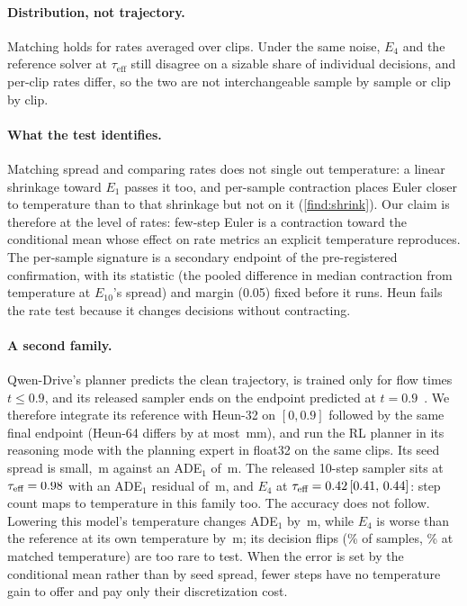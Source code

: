 \documentclass{article}
\theoremstyle{plain}
\theoremstyle{definition}
\theoremstyle{remark}
\newcommand{\taueff}{\tau_{\mathrm{eff}}}
\newcommand{\TODO}[1]{\todo[inline,color=orange!25]{TODO: #1}}
\begin{document}
\paragraph{Distribution, not trajectory.} Matching holds for rates averaged over clips. Under the same noise, $E_4$ and the reference solver at $\taueff$ still disagree on a sizable share of individual decisions, and per-clip rates differ, so the two are not interchangeable sample by sample or clip by clip.
\paragraph{What the test identifies.} Matching spread and comparing rates does not single out temperature: a linear shrinkage toward $E_1$ passes it too, and per-sample contraction places Euler closer to temperature than to that shrinkage but not on it (\cref{find:shrink}). Our claim is therefore at the level of rates: few-step Euler is a contraction toward the conditional mean whose effect on rate metrics an explicit temperature reproduces. The per-sample signature is a secondary endpoint of the pre-registered confirmation, with its statistic (the pooled difference in median contraction from temperature at $E_{10}$'s spread) and margin (0.05) fixed before it runs. Heun fails the rate test because it changes decisions without contracting.
\paragraph{A second family.} Qwen-Drive's planner predicts the clean trajectory, is trained only for flow times $t\le0.9$, and its released sampler ends on the endpoint predicted at $t=0.9$~\citep{qwendrive2026}. We therefore integrate its reference with Heun-32 on $[0,0.9]$ followed by the same final endpoint (Heun-64 differs by at most \QDConvMM\,mm), and run the RL planner in its reasoning mode with the planning expert in float32 on the same \QDClips{} clips. Its seed spread is small, \QDRefSpread\,m against an ADE$_1$ of \QDRefADE\,m. The released 10-step sampler sits at $\tau_{\text{eff}}=0.98$ with an ADE$_1$ residual of \QDETenResid\,m, and $E_4$ at $\tau_{\text{eff}}=0.42\,[0.41,\,0.44]$: step count maps to temperature in this family too. The accuracy does not follow. Lowering this model's temperature changes ADE$_1$ by \QDEFourMatchedGain\,m, while $E_4$ is worse than the reference at its own temperature by \QDEFourResid\,m; its decision flips (\QDEFourFlip\% of samples, \QDEFourFlipMatched\% at matched temperature) are too rare to test. When the error is set by the conditional mean rather than by seed spread, fewer steps have no temperature gain to offer and pay only their discretization cost. \TODO{SFT planner (running).}
\end{document}
